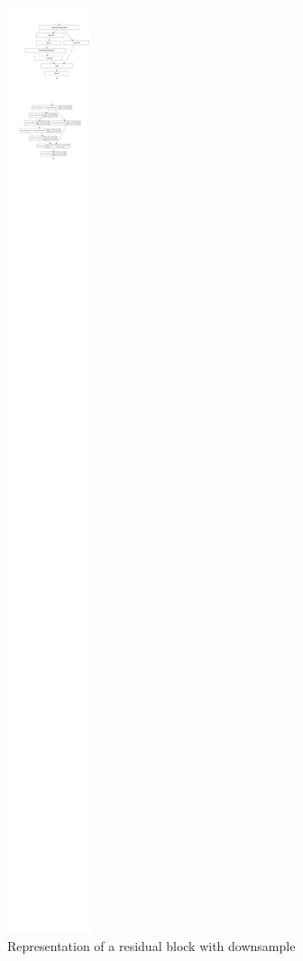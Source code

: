 \documentclass[10pt,twocolumn,letterpaper]{article}
\begin{document}
\begin{figure}[H]
   \centering
   \includegraphics[width=0.7\linewidth]{./immagini/residual_block_with_downsample.pdf}
   \caption{Representation of a residual block with downsample}
\end{figure}
\end{document}
